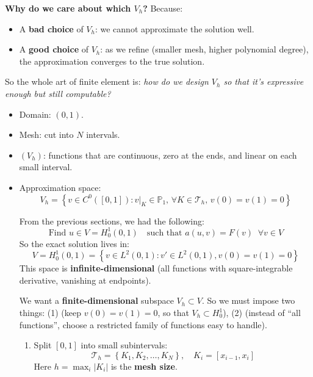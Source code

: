 \highspace
\textcolor{Green3}{ \textbf{Why do we care about which $V_{h}$?}} Because:
\begin{itemize}
    \item A \textbf{bad choice} of $V_{h}$: we cannot approximate the solution well.
    \item A \textbf{good choice} of $V_{h}$: as we refine (smaller mesh, higher polynomial degree), the approximation converges to the true solution.
\end{itemize}
So the whole art of finite element is: \emph{how do we design $V_{h}$ so that it's expressive enough but still computable?}
\begin{itemize}
    \item Domain: $\left(0, 1\right)$.
    \item Mesh: cut into $N$ intervals.
    \item $\left(V_{h}\right)$: functions that are continuous, zero at the ends, and linear on each small interval.
    \item Approximation space:
    \begin{equation*}
        V_{h} = \left\{ v \in C^0([0,1]) : v|_{K} \in \mathbb{P}_1, \, \forall K \in \mathcal{T}_h, \, v(0)=v(1)=0 \right\}
    \end{equation*}
    \begin{deepeningbox}
        From the previous sections, we had the following:
        \begin{equation*}
            \text{Find } u \in V = H_{0}^{1}\left(0,1\right) \quad \text{such that } a\left(u,v\right) = F\left(v\right) \;\; \forall v \in V
        \end{equation*}
        So the exact solution lives in:
        \begin{equation*}
            V = H_{0}^{1}\left(0,1\right) = \left\{ v \in L^{2}\left(0,1\right): v' \in L^{2}\left(0,1\right), v\left(0\right) = v\left(1\right) = 0 \right\}
        \end{equation*}
        This space is \textbf{infinite-dimensional} (all functions with square-integrable derivative, vanishing at endpoints).

        \highspace
        We want a \textbf{finite-dimensional} subspace $V_{h} \subset V$. So we must impose two things: (1)  (keep $v(0)=v(1)=0$, so that $V_h \subset H_0^1$), (2)  (instead of ``all functions'', choose a restricted family of functions easy to handle).
        \begin{enumerate}
            \item {} Split $[0,1]$ into small subintervals:
            \begin{equation*}
                \mathcal{T}_{h} = \left\{K_{1}, K_{2}, \dots, K_{N}\right\}, \quad K_{i} = \left[x_{i-1}, x_{i}\right]
            \end{equation*}
            Here $h = \max_i \left|K_{i}\right|$ is the \textbf{mesh size}.


\end{enumerate}
\end{deepeningbox}
\end{itemize}
